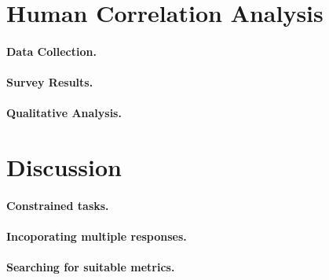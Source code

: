 \documentclass[runningheads]{llncs}
\begin{document}
\section{Human Correlation Analysis}
\paragraph{Data Collection.}
\paragraph{Survey Results.}
\paragraph{Qualitative Analysis.}

\section{Discussion}
\paragraph{Constrained tasks.}
\paragraph{Incoporating multiple responses.}
\paragraph{Searching for suitable metrics.}
\end{document}
